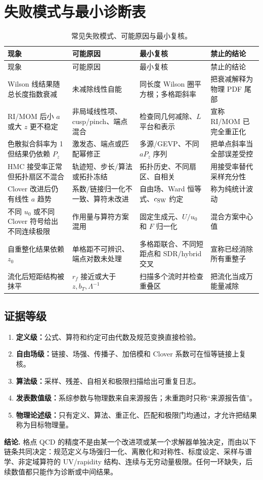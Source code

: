\chapter{失败模式与最小诊断表}

\begin{longtable}{L{2.7cm}L{3.9cm}L{3.7cm}L{3.0cm}}
\caption{常见失败模式、可能原因与最小复核。}\label{tab:failures}\\
\toprule
现象 & 可能原因 & 最小复核 & 禁止的结论\\
\midrule
\endfirsthead
\toprule
现象 & 可能原因 & 最小复核 & 禁止的结论\\
\midrule
\endhead
Wilson 线结果随总长度指数衰减 & 未减除线性自能 & 同长度 Wilson 圈平方根；多格距斜率 & 把衰减解释为物理 PDF 尾部\\
RI/MOM 后小 \(a\) 或大 \(z\) 更不稳定 & 非局域线性项、cusp/pinch、端点混合 & 检查同几何减除、\(L\) 平台和表示 & 宣称 RI/MOM 已完全重正化\\
色散拟合斜率为 1 但结果仍依赖 \(P_z\) & 激发态、端点或匹配幂修正 & 多源/GEVP、不同 \(aP_z\) 序列 & 把单点斜率当全部误差受控\\
HMC 接受率正常但拓扑扇区不混合 & 轨迹短、步长/算法或拓扑冻结 & 拓扑历史、不同扇区、自相关 & 用接受率替代采样充分性\\
Clover 改进后仍有线性 \(a\) 趋势 & 系数/链接归一化不一致、算符未改进 & 自由场、Ward 恒等式、\(c_{\rm SW}\) 约定 & 称为纯统计波动\\
不同 \(u_0\) 或不同 Clover 符号给出不同连续极限 & 作用量与算符方案混用 & 固定生成元、\(U/u_0\) 和 \(F\) 归一化 & 混合方案中心值\\
自重整化结果依赖 \(z_0\) & 单格距不可辨识、端点对数未处理 & 多格距联合、不同短距点和 SDR/hybrid 交叉 & 宣称已经消除所有重整子\\
流化后短距结构被抹平 & \(r_f\) 接近或大于 \(z,b_T,\Lambda^{-1}\) & 扫描多个流时并检查重叠区 & 把流化当成万能量减除\\
\bottomrule
\end{longtable}

\section{证据等级}

\begin{enumerate}
  \item \textbf{定义级：}公式、算符和约定可由代数及规范变换直接检验。
  \item \textbf{自由场级：}链接、场强、传播子、加倍模和 Clover 系数可在恒等链接上复核。
  \item \textbf{算法级：}采样、残差、自相关和极限扫描给出可重复日志。
  \item \textbf{发表数值级：}系综参数与物理数来自来源报告；未重跑时只称“来源报告值”。
  \item \textbf{物理论述级：}只有定义、算法、重正化、匹配和极限门均通过，才允许把结果称为目标物理量。
\end{enumerate}

\noindent\textbf{结论.} 格点 QCD 的精度不是由某一个改进项或某一个求解器单独决定，而由以下链条共同决定：规范定义与场强归一化、离散化和对称性、标度设定、采样与谱学、非定域算符的 UV/rapidity 结构、连续与无穷动量极限。任何一环缺失，后续数值都只能作为诊断或中间结果。
